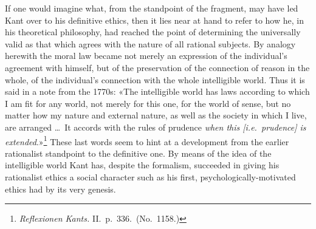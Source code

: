 \documentclass[12pt,a4paper]{article}
\begin{document}
If one would imagine what, from the standpoint of the fragment, may have led
Kant over to his definitive ethics, then it lies near at hand to refer to
how he, in his theoretical philosophy, had reached the point of determining
the universally valid as that which agrees with the nature of all rational
subjects. By analogy herewith the moral law became not merely an expression
of the individual's agreement with himself, but of the preservation of the
connection of reason in the whole, of the individual's connection with the
whole intelligible world. Thus it is said in a note from the 1770s: «The
intelligible world has laws according to which I am fit for any world, not
merely for this one, for the world of sense, but no matter how my nature and
external nature, as well as the society in which I live, are arranged \ldots\
It accords with the rules of prudence \emph{when this [i.e.\ prudence] is
extended}.»\footnote{\textit{Reflexionen Kants.} II.\ p.\ 336.\ (No.\
1158.)} These last words seem to hint at a development from the earlier
rationalist standpoint to the definitive one. By means of the idea of the
intelligible world Kant has, despite the formalism, succeeded in giving his
rationalist ethics a social character such as his first,
psychologically-motivated ethics had by its very genesis.
\end{document}
